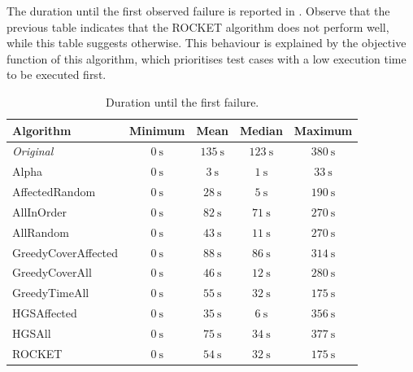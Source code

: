 \noindent The duration until the first observed failure is reported in . Observe that the previous table indicates that the ROCKET algorithm does not perform well, while this table suggests otherwise. This behaviour is explained by the objective function of this algorithm, which prioritises test cases with a low execution time to be executed first.

\begin{table}[htbp!]
	\centering
	\begin{tabularx}{\textwidth}{|X||c|c|c|c|}
		\hline
		\textbf{Algorithm} & \textbf{Minimum} & \textbf{Mean} & \textbf{Median} & \textbf{Maximum}\\
		
		\hline
		
		\emph{Original} & $\SI{0}{\second}$ & $\SI{135}{\second}$ & $\SI{123}{\second}$ & $\SI{380}{\second}$\\
		
		\hline
		
		Alpha & $\SI{0}{\second}$ & $\SI{3}{\second}$ & $\SI{1}{\second}$ & $\SI{33}{\second}$\\
		
		\hline
		AffectedRandom & $\SI{0}{\second}$ & $\SI{28}{\second}$ & $\SI{5}{\second}$ & $\SI{190}{\second}$\\
		AllInOrder & $\SI{0}{\second}$ & $\SI{82}{\second}$ & $\SI{71}{\second}$ & $\SI{270}{\second}$\\
		AllRandom & $\SI{0}{\second}$ & $\SI{43}{\second}$ & $\SI{11}{\second}$ & $\SI{270}{\second}$\\
		
		\hline
		
		GreedyCoverAffected & $\SI{0}{\second}$ & $\SI{88}{\second}$ & $\SI{86}{\second}$ & $\SI{314}{\second}$\\
		GreedyCoverAll & $\SI{0}{\second}$ & $\SI{46}{\second}$ & $\SI{12}{\second}$ & $\SI{280}{\second}$\\
		GreedyTimeAll & $\SI{0}{\second}$ & $\SI{55}{\second}$ & $\SI{32}{\second}$ & $\SI{175}{\second}$\\
		
		\hline
		
		HGSAffected & $\SI{0}{\second}$ & $\SI{35}{\second}$ & $\SI{6}{\second}$ & $\SI{356}{\second}$\\
		HGSAll & $\SI{0}{\second}$ & $\SI{75}{\second}$ & $\SI{34}{\second}$ & $\SI{377}{\second}$\\
		
		\hline
		
		ROCKET & $\SI{0}{\second}$ & $\SI{54}{\second}$ & $\SI{32}{\second}$ & $\SI{175}{\second}$\\
		
		\hline
	\end{tabularx}
	\caption{Duration until the first failure.}
	\label{tbl:rq4-first-failure-duration}
\end{table}

